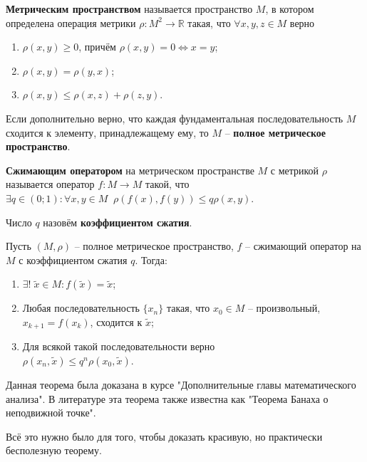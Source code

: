 \documentclass[main.tex]{subfile}
\begin{document}
\begin{define}
	\textbf{Метрическим пространством} называется пространство $M$, в
	котором определена операция метрики $\rho: M^2 \rightarrow \mathbb R $
	такая, что $\forall x, y, z \in M$ верно
	\begin{enumerate}
		\item $\rho(x,y)\ge 0$, причём $\rho(x,y) = 0 \Leftrightarrow x=y$;
		\item $\rho(x,y)=\rho(y,x)$;
		\item $\rho(x,y)\le \rho(x,z) + \rho(z,y)$.
	\end{enumerate}

	Если дополнительно верно, что каждая фундаментальная последовательность
	$M$ сходится к элементу, принадлежащему ему, то $M$ --
	\textbf{полное метрическое пространство}.
\end{define}

\begin{define}
	\textbf{Сжимающим оператором} на метрическом пространстве $M$ с метрикой
	$\rho$ называется оператор $f: M \rightarrow M$ такой, что\\
	$\exists q \in(0;1):\forall x,y \in M\;\; \rho(f(x),f(y)) \le q \rho(x,y)$.

	Число $q$ назовём \textbf{коэффициентом сжатия}.
\end{define}

\begin{theorem}
	Пусть $(M,\rho)$ -- полное метрическое пространство, $f$ -- сжимающий
	оператор на $M$ с коэффициентом сжатия $q$. Тогда:
	\begin{enumerate}
		\item $\exists!\;\widetilde{x}\in M: f(\widetilde{x})=\widetilde{x}$;
		\item Любая последовательность $\{x_n\}$ такая, что $x_0 \in M$ --
			произвольный, $x_{k+1}=f(x_k)$, сходится к $\widetilde{x}$;
		\item Для всякой такой последовательности верно\\
			$\rho(x_n, \widetilde{x}) \le q ^ n \rho(x_0, \widetilde{x})$.
	\end{enumerate}
\end{theorem}

Данная теорема была доказана в курсе "Дополнительные главы математического анализа"{}.
В литературе эта теорема также известна как "Теорема Банаха о неподвижной точке"{}.

Всё это нужно было для того, чтобы доказать красивую, но практически бесполезную
теорему.
\end{document}
